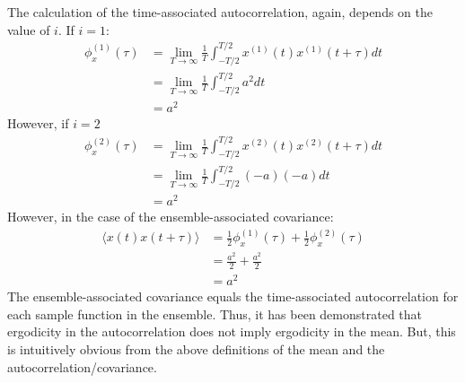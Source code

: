 \begin{homeworkProblem}
The calculation of the time-associated autocorrelation, again, depends on the value of $
i $. If $ i=1 $:
\begin{align*}
   \phi_{x}^{(1)}(\tau) &=
   \lim_{T \to \infty}\frac{1}{T} \int_{-T/2}^{T/2} x^{(1)}(t)x^{(1)}(t+\tau) dt
   \\
   &= \lim_{T \to \infty} \frac{1}{T}\int_{-T/2}^{T/2}a^2 dt \\
   &= a^2
\end{align*}
However, if $ i=2 $
\begin{align*}
   \phi_{x}^{(2)}(\tau) &=
   \lim_{T \to \infty}\frac{1}{T} \int_{-T/2}^{T/2} x^{(2)}(t)x^{(2)}(t+\tau) dt
   \\
   &= \lim_{T \to \infty} \frac{1}{T}\int_{-T/2}^{T/2}(-a)(-a) dt \\
   &= a^2
\end{align*}
However, in the case of the ensemble-associated covariance:
\begin{align*}
   \langle x(t) x(t +\tau) \rangle &= \frac{1}{2}\phi_{x}^{(1)}(\tau) +
   \frac{1}{2} \phi_{x}^{(2)}(\tau) \\
   &= \frac{a^2}{2} + \frac{a^2}{2} \\
   &= a^2
\end{align*}
The ensemble-associated covariance equals the time-associated
autocorrelation for each sample function in the ensemble. Thus, it has been
demonstrated that ergodicity in the autocorrelation does not imply ergodicity in
the mean. But, this is intuitively obvious from the above definitions of the
mean and the autocorrelation/covariance.
\end{homeworkProblem}

